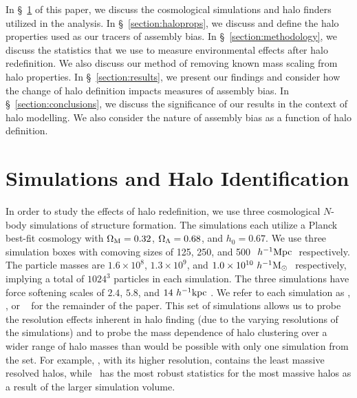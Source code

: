 \documentclass[usenatbib]{mnras}
\begin{document}
 
In \S~\ref{section:data} of this paper, we discuss the cosmological simulations and halo finders
utilized in the analysis. In \S~\ref{section:haloprops}, we discuss 
and define the halo properties used as our tracers of assembly bias. In \S~\ref{section:methodology}, 
we discuss the statistics that we use to measure environmental effects after
halo redefinition. We also discuss our method of removing known mass scaling from halo properties.
In \S~\ref{section:results}, we present our findings and consider how the change
of halo definition impacts measures of assembly bias. In
\S~\ref{section:conclusions}, we discuss the significance of our results in the context of halo modelling.
 We also consider the nature of assembly bias as a function of halo definition.





\section[]{Simulations and Halo Identification}
\label{section:data}


In order to study the effects of halo redefinition, we use three cosmological $N$-body simulations of structure
formation. The \citet{diemer_kravtsov15} simulations each utilize a Planck best-fit cosmology with $\Omega_{\mathrm{M}} = 0.32$, $\Omega_{\Lambda} =
0.68$, and $h_0 = 0.67$. We use three simulation boxes with comoving sizes of 125, 250, and 500
$\ h^{-1}\mathrm{Mpc}~$ respectively. The particle masses are $1.6 \times 10^8$, $1.3 \times 10^9$, and $1.0 \times 10^{10}
\ h^{-1}\mathrm{M}_{\odot}~$ respectively, implying a total of $1024^3$ particles in each simulation. The three
simulations have force softening scales of $2.4$, $5.8$, and $14 \ h^{-1}\mathrm{kpc}~$. We refer to each simulation as
\simA, \simB, or \simC~  for the remainder of the paper. This set of simulations allows us to probe the
resolution effects inherent in halo finding (due to the varying resolutions of the simulations) and to probe the
mass dependence of halo clustering over a wider range of halo masses than would be possible with only one
simulation from the set. For example, \simA, with its higher resolution, contains the least massive resolved
halos, while \simC~has the most robust statistics for the most massive halos as a result of the larger simulation
volume.
\end{document}
